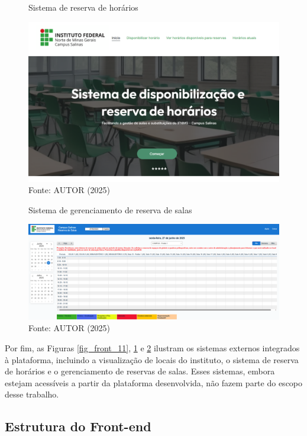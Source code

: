 \begin{figure}[H]
    \centering
    \caption{Sistema de reserva de horários}
    \includegraphics[width=1\textwidth]{Figuras/front-12.png}
    \caption*{Fonte: AUTOR (2025)}
    \label{fig_front_12}
\end{figure}

\begin{figure}[htb]
    \centering
    \caption{Sistema de gerenciamento de reserva de salas}
    \includegraphics[width=1\textwidth]{Figuras/front-13.png}
    \caption*{Fonte: AUTOR (2025)}
    \label{fig_front_13}
\end{figure}

Por fim, as Figuras \ref{fig_front_11}, \ref{fig_front_12} e \ref{fig_front_13} ilustram os sistemas externos integrados à plataforma, incluindo a visualização de locais do instituto, o sistema de reserva de horários e o gerenciamento de reservas de salas. Esses sistemas, embora estejam acessíveis a partir da plataforma desenvolvida, não fazem parte do escopo desse trabalho.

\subsection{Estrutura do Front-end}

